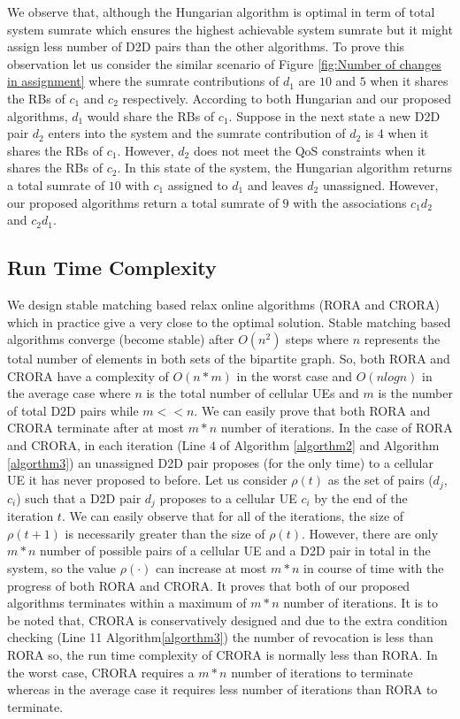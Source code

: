 \documentclass[times]{dacauth}
\begin{document}
\smallskip
\noindent
We observe that, although the Hungarian algorithm is optimal in term of total system sumrate which ensures the highest achievable system sumrate but it might assign less number of D2D pairs than the other algorithms. To prove this observation let us consider the similar scenario of Figure \ref{fig:Number of changes in assignment} where the sumrate contributions of $d_{1}$ are $10$ and $5$ when it shares the RBs of $ c_{1}$ and $ c_{2}$ respectively. According to both Hungarian and our proposed algorithms, $d_{1}$ would share the RBs of $c_{1}$. Suppose in the next state a new D2D pair $d_{2}$ enters into the system and the sumrate contribution of $d_{2}$ is $4$ when it shares the RBs of $ c_{1}$. However, $d_{2}$ does not meet the QoS constraints when it shares the RBs of $c_{2}$. In this state of the system, the Hungarian algorithm returns a total sumrate of $10$ with $c_1$ assigned to $d_1$ and leaves $d_2$ unassigned. However, our proposed algorithms return a total sumrate of $9$ with the associations  $c_1d_2$ and $c_2d_1$.  

\subsection{Run Time Complexity}
\smallskip
\noindent
 We design stable matching based relax online algorithms (RORA and CRORA) which in practice give a very close to the optimal solution. Stable matching based algorithms converge (become stable) after $O(n^2)$ \cite{kleinberg2011algorithm} steps where $n$ represents the total number of elements in both sets of the bipartite graph. So, both  RORA and CRORA have a complexity of  $O(n*m)$ in the worst case and  $O(nlogn)$ in the average case where $n$ is the total number of cellular UEs and $m$ is the number of total D2D pairs while $m<<n$. We can easily prove that both RORA and CRORA terminate after at most $m*n$ number of iterations. In the case of RORA and CRORA, in each iteration (Line $4$ of Algorithm \ref{algorthm2} and Algorithm \ref{algorthm3}) an unassigned D2D pair proposes (for the only time) to a cellular UE it has never proposed to before. Let us consider $\rho(t)$ as the set of pairs ($d_j$, $c_i$) such that a D2D pair $d_j$ proposes to a cellular UE $c_i$  by the end of the iteration $t$. We can easily observe that for all of the iterations, the size of $\rho(t + 1)$ is necessarily greater than the size of $\rho(t)$. However, there are only $m*n$ number of possible pairs of a cellular UE and a D2D pair in total in the system, so the value $\rho(\cdot)$ can increase at most $m*n$ in course of time with the progress of both RORA and CRORA. It proves that both of our proposed algorithms terminates within a maximum of  $m*n$ number of iterations. It is to be noted that, CRORA is conservatively designed and due to the extra condition checking (Line 11 Algorithm\ref{algorthm3}) the number of revocation is less than RORA so, the run time complexity of CRORA is normally less than RORA. In the worst case, CRORA requires a $m*n$ number of iterations to terminate whereas in the average case it requires less number of iterations than RORA to terminate.
  
\end{document}
